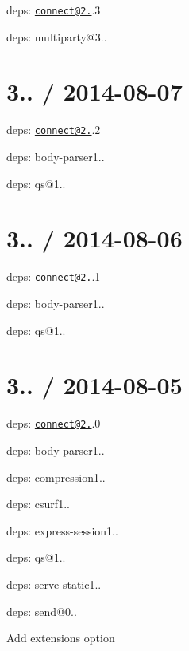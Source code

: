 \begin{DoxyItemize}
\item deps\+: \href{mailto:connect@2.25}{\tt connect@2.}.3
\begin{DoxyItemize}
\item deps\+: multiparty@3..
\end{DoxyItemize}
\end{DoxyItemize}

\section*{3.. / 2014-\/08-\/07 }


\begin{DoxyItemize}
\item deps\+: \href{mailto:connect@2.25}{\tt connect@2.}.2
\begin{DoxyItemize}
\item deps\+: body-\/parser1..
\item deps\+: qs@1..
\end{DoxyItemize}
\end{DoxyItemize}

\section*{3.. / 2014-\/08-\/06 }


\begin{DoxyItemize}
\item deps\+: \href{mailto:connect@2.25}{\tt connect@2.}.1
\begin{DoxyItemize}
\item deps\+: body-\/parser1..
\item deps\+: qs@1..
\end{DoxyItemize}
\end{DoxyItemize}

\section*{3.. / 2014-\/08-\/05 }


\begin{DoxyItemize}
\item deps\+: \href{mailto:connect@2.25}{\tt connect@2.}.0
\begin{DoxyItemize}
\item deps\+: body-\/parser1..
\item deps\+: compression1..
\item deps\+: csurf1..
\item deps\+: express-\/session1..
\item deps\+: qs@1..
\item deps\+: serve-\/static1..
\end{DoxyItemize}
\item deps\+: send@0..
\begin{DoxyItemize}
\item Add {\ttfamily extensions} option
\end{DoxyItemize}
\end{DoxyItemize}


